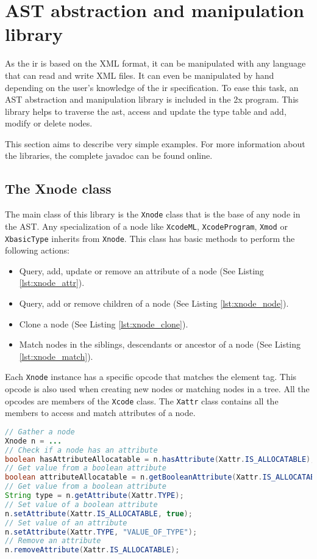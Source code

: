\chapter{\xcodeml AST abstraction and manipulation library}
\label{chapter:astmanip}
As the \xcodeml \gls{ir} is based on the XML format, it can be manipulated with
any language that can read and write XML files. It can even be manipulated by
hand depending on the user's knowledge of the \xcodeml \gls{ir} specification.
To ease this task, an AST abstraction and manipulation library is included
in the \cx2x program. This library helps to traverse the \gls{ast}, access and
update the type table and add, modify or delete nodes.

This section aims to describe very simple examples. For more information about
the libraries, the complete javadoc\cite{claw:online, claw:javadoc} can be
found online.

\section{The Xnode class}
The main class of this library is the \lstinline|Xnode| class that is the base
of any node in the AST.
Any specialization of a node like \lstinline|XcodeML|,
\lstinline|XcodeProgram|, \lstinline|Xmod| or \lstinline|XbasicType| inherits
from \lstinline|Xnode|.
This class has basic methods to perform the following actions:
\begin{itemize}
\item Query, add, update or remove an attribute of a node
      (See Listing \ref{lst:xnode_attr}).
\item Query, add or remove children of a node (See Listing \ref{lst:xnode_node}).
\item Clone a node (See Listing \ref{lst:xnode_clone}).
\item Match nodes in the siblings, descendants or ancestor of a node
      (See Listing \ref{lst:xnode_match}).
\end{itemize}

Each \lstinline|Xnode| instance has a specific opcode that matches the \xcodemlf
element tag.
This opcode is also used when creating new nodes or matching nodes in a tree.
All the opcodes are members of the \lstinline|Xcode| class.
The \lstinline|Xattr| class contains all the members to access and match
attributes of a node.

\begin{lstlisting}[label=lst:xnode_attr, language=Java,
  caption=Xnode attribute methods]
// Gather a node
Xnode n = ...
// Check if a node has an attribute
boolean hasAttributeAllocatable = n.hasAttribute(Xattr.IS_ALLOCATABLE);
// Get value from a boolean attribute
boolean attributeAllocatable = n.getBooleanAttribute(Xattr.IS_ALLOCATABLE);
// Get value from a boolean attribute
String type = n.getAttribute(Xattr.TYPE);
// Set value of a boolean attribute
n.setAttribute(Xattr.IS_ALLOCATABLE, true);
// Set value of an attribute
n.setAttribute(Xattr.TYPE, "VALUE_OF_TYPE");
// Remove an attribute
n.removeAttribute(Xattr.IS_ALLOCATABLE);
\end{lstlisting}

